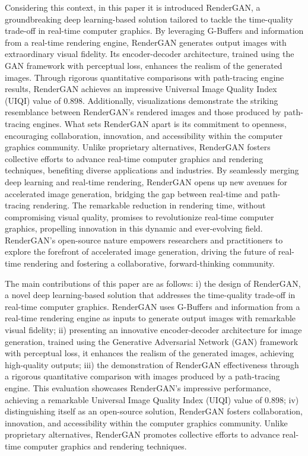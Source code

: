 Considering this context, in this paper it is introduced RenderGAN, a groundbreaking deep learning-based solution tailored to tackle the time-quality trade-off in real-time computer graphics. By leveraging G-Buffers and information from a real-time rendering engine, RenderGAN generates output images with extraordinary visual fidelity. Its encoder-decoder architecture, trained using the GAN framework with perceptual loss, enhances the realism of the generated images. Through rigorous quantitative comparisons with path-tracing engine results, RenderGAN achieves an impressive Universal Image Quality Index (UIQI) value of 0.898. Additionally, visualizations demonstrate the striking resemblance between RenderGAN's rendered images and those produced by path-tracing engines. What sets RenderGAN apart is its commitment to openness, encouraging collaboration, innovation, and accessibility within the computer graphics community. Unlike proprietary alternatives, RenderGAN fosters collective efforts to advance real-time computer graphics and rendering techniques, benefiting diverse applications and industries. By seamlessly merging deep learning and real-time rendering, RenderGAN opens up new avenues for accelerated image generation, bridging the gap between real-time and path-tracing rendering. The remarkable reduction in rendering time, without compromising visual quality, promises to revolutionize real-time computer graphics, propelling innovation in this dynamic and ever-evolving field. RenderGAN's open-source nature empowers researchers and practitioners to explore the forefront of accelerated image generation, driving the future of real-time rendering and fostering a collaborative, forward-thinking community.

The main contributions of this paper are as follows: i) the design of RenderGAN, a novel deep learning-based solution that addresses the time-quality trade-off in real-time computer graphics. RenderGAN uses G-Buffers and information from a real-time rendering engine as inputs to generate output images with remarkable visual fidelity; ii) presenting an innovative encoder-decoder architecture for image generation, trained using the Generative Adversarial Network (GAN) framework with perceptual loss, it enhances the realism of the generated images, achieving high-quality outputs; iii) the demonstration of RenderGAN effectiveness  through a rigorous quantitative comparison with images produced by a path-tracing engine. This evaluation showcases RenderGAN's impressive performance, achieving a remarkable Universal Image Quality Index (UIQI) value of 0.898; iv) distinguishing itself as an open-source solution, RenderGAN fosters collaboration, innovation, and accessibility within the computer graphics community. Unlike proprietary alternatives, RenderGAN promotes collective efforts to advance real-time computer graphics and rendering techniques.

